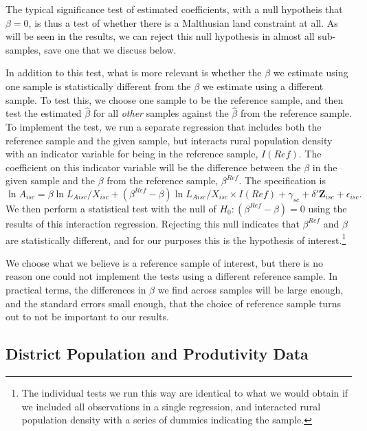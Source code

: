 \documentclass[11pt]{article}
\begin{document}
The typical significance test of estimated coefficients, with a null hypotheis that $\beta=0$, is thus a test of whether there is a Malthusian land constraint at all. As will be seen in the results, we can reject this null hypothesis in almost all sub-samples, save one that we discuss below.

In addition to this test, what is more relevant is whether the $\beta$ we estimate using one sample is statistically different from the $\beta$ we estimate using a different sample. To test this, we choose one sample to be the reference sample, and then test the estimated $\hat{\beta}$ for all \textit{other} samples against the $\hat{\beta}$ from the reference sample. To implement the test, we run a separate regression that includes both the reference sample and the given sample, but interacts rural population density with an indicator variable for being in the reference sample, $I(Ref)$. The coefficient on this indicator variable will be the difference between the $\beta$ in the given sample and the $\beta$ from the reference sample, $\beta^{Ref}$. The specification is
\begin{equation}
    \ln A_{isc} = \beta \ln L_{Aisc}/X_{isc} + (\beta^{Ref} - \beta) \ln L_{Aisc}/X_{isc} \times I(Ref) + \gamma_{sc} + \delta' \mathbf{Z}_{isc} + \epsilon_{isc}. \label{EQ_interaction}
\end{equation}
We then perform a statistical test with the null of $H_0: (\beta^{Ref} - \beta) = 0$ using the results of this interaction regression. Rejecting this null indicates that $\beta^{Ref}$ and $\beta$ are statistically different, and for our purposes this is the hypothesis of interest.\footnote{The individual tests we run this way are identical to what we would obtain if we included all observations in a single regression, and interacted rural population density with a series of dummies indicating the sample.} 

We choose what we believe is a reference sample of interest, but there is no reason one could not implement the tests using a different reference sample. In practical terms, the differences in $\beta$ we find across samples will be large enough, and the standard errors small enough, that the choice of reference sample turns out to not be important to our results. 

\subsection{District Population and Produtivity Data}
\end{document}
